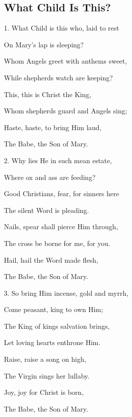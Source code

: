 \subsection{What Child Is This?}\label{what_child}
\begin{description}[nosep,leftmargin=\parindent,labelsep=0pt]
\item 1. What Child is this who, laid to rest 
\item On Mary's lap is sleeping? 
\item Whom Angels greet with anthems sweet, 
\item While shepherds watch are keeping? 
\vspace{1.5ex}
\item This, this is Christ the King, 
\item Whom shepherds guard and Angels sing; 
\item Haste, haste, to bring Him laud, 
\item The Babe, the Son of Mary. 
\vspace{1.5ex}
\item 2. Why lies He in such mean estate, 
\item Where ox and ass are feeding? 
\item Good Christians, fear, for sinners here 
\item The silent Word is pleading. 
\vspace{1.5ex}
\item Nails, spear shall pierce Him through, 
\item The cross be borne for me, for you. 
\item Hail, hail the Word made flesh, 
\item The Babe, the Son of Mary. 
\vspace{1.5ex}
\item 3. So bring Him incense, gold and myrrh, 
\item Come peasant, king to own Him; 
\item The King of kings salvation brings, 
\item Let loving hearts enthrone Him. 
\vspace{1.5ex}
\item Raise, raise a song on high, 
\item The Virgin sings her lullaby. 
\item Joy, joy for Christ is born, 
\item The Babe, the Son of Mary. 
\end{description}
